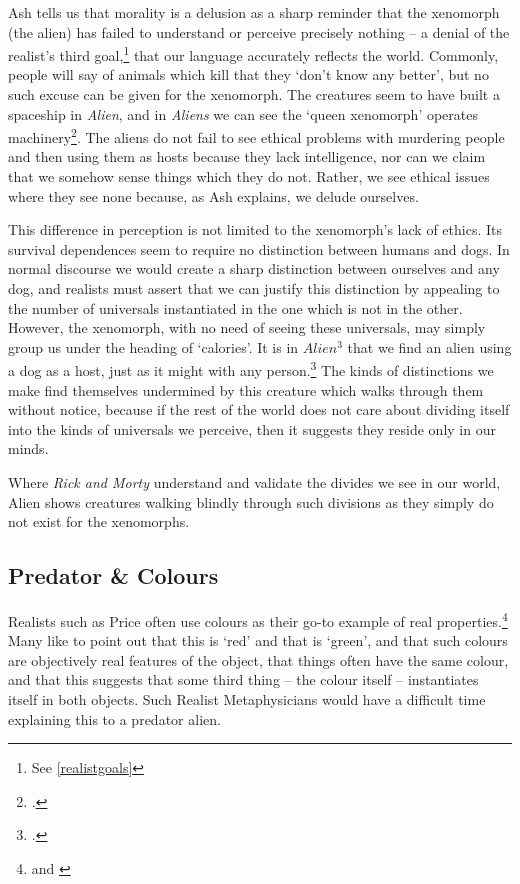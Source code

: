 \documentclass{article}
\begin{document}
Ash tells us that morality is a delusion as a sharp reminder that the xenomorph (the alien) has failed to understand or perceive precisely nothing -- a denial of the realist's third goal,\footnote{See \ref{realistgoals}} that our language accurately reflects the world.  Commonly, people will say of animals which kill that they `don't know any better', but no such excuse can be given for the xenomorph. The creatures seem to have built a spaceship in \textit{Alien}, and in \textit{Aliens} we can see the `queen xenomorph' operates machinery\footcite{aliens}. The aliens do not fail to see ethical problems with murdering people and then using them as hosts because they lack intelligence, nor can we claim that we somehow sense things which they do not. Rather, we see ethical issues where they see none because, as Ash explains, we delude ourselves.

This difference in perception is not limited to the xenomorph's lack of ethics. Its survival dependences seem to require no distinction between humans and dogs. In normal discourse we would create a sharp distinction between ourselves and any dog, and realists must assert that we can justify this distinction by appealing to the number of universals instantiated in the one which is not in the other. However, the xenomorph, with no need of seeing these universals, may simply group us under the heading of `calories'. It is in \textit{$Alien ^{3}$} that we find an alien using a dog as a host, just as it might with any person.\footcite{alien3} The kinds of distinctions we make find themselves undermined by this creature which walks through them without notice, because if the rest of the world does not care about dividing itself into the kinds of universals we perceive, then it suggests they reside only in our minds.

Where \textit{Rick and Morty} understand and validate the divides we see in our world, Alien shows creatures walking blindly through such divisions as they simply do not exist for the xenomorphs.

\subsection{Predator \& Colours}
Realists such as Price often use colours as their go-to example of real properties.\footnote{\cite[p 27]{metaphysicscontemporaryintro} and \cite[p 8]{thinkingexperience}} Many like to point out that this is `red' and that is `green', and that such colours are objectively real features of the object, that things often have the same colour, and that this suggests that some third thing -- the colour itself -- instantiates itself in both objects. Such Realist Metaphysicians would have a difficult time explaining this to a predator alien.
\end{document}
